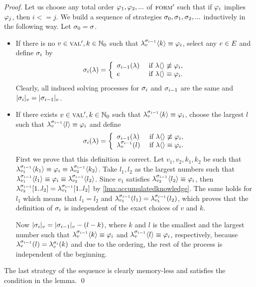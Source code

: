 \begin{proof}
Let us choose any total order $\varphi_1, \varphi_2, ...$ of ${\textsc{form}'}$ such that
  if $\varphi_i$ implies $\varphi_j$, then $i <= j$.
We build a sequence of strategies $\sigma_0, \sigma_1, \sigma_2, ...$ inductively in the following way.
Let $\sigma_0 = \sigma$.
\begin{itemize}
\item If there is no $v\in\textsc{val}', k\in\mathbb{N}_0$ such that
  $\lambda^{\sigma_{i-1}}_{v}\langle k\rangle \equiv \varphi_i$, select any $e\in E$ and
  define $\sigma_i$ by
\[
\sigma_i(\lambda) = \left\{
 \begin{array}{lll}
 \sigma_{i-1}(\lambda)  & \textrm{ if } \lambda\langle\rangle\not\equiv\varphi_i,\\
 e               & \textrm{ if } \lambda\langle\rangle\equiv\varphi_i.
 \end{array}
 \right.
\]
Clearly, all induced solving processes for $\sigma_i$ and $\sigma_{i-1}$ are the same
  and $|\sigma_i|_{v} = |\sigma_{i-1}|_{v}$.

\item If there exists $v\in\textsc{val}', k\in\mathbb{N}_0$ such that
  $\lambda^{\sigma_{i-1}}_{v}\langle k\rangle \equiv \varphi_i$, choose the largest $l$ such that
  $\lambda^{\sigma_{i-1}}_{v}\langle l\rangle \equiv \varphi_i$ and define
\[
\sigma_i(\lambda) = \left\{
 \begin{array}{lll}
 \sigma_{i-1}(\lambda)            & \textrm{ if } \lambda\langle\rangle\not\equiv\varphi_i,\\
 \lambda^{\sigma_{i-1}}_{v}(l)   & \textrm{ if } \lambda\langle\rangle\equiv\varphi_i.
 \end{array}
 \right.
\]
First we prove that this definition is correct.
Let $v_1, v_2, k_1, k_2$ be such that
  $\lambda^{\sigma_{i-1}}_{v_1}\langle k_1\rangle\equiv\varphi_i\equiv\lambda^{\sigma_{i-1}}_{v_2}\langle k_2\rangle$.
Take $l_1, l_2$ as the largest numbers such that
  $\lambda^{\sigma_{i-1}}_{v_1}\langle l_1\rangle\equiv\varphi_i\equiv\lambda^{\sigma_{i-1}}_{v_2}\langle l_2\rangle$.
Since $v_1$ satisfies $\lambda^{\sigma_{i-1}}_{v_2}\langle l_2\rangle\equiv\varphi_i$,
  then $\lambda^{\sigma_{i-1}}_{v_2}[1..l_2] = \lambda^{\sigma_{i-1}}_{v_1}[1..l_2]$
  by \autoref{lma:accumulatedknowledge}.
The same holds for $l_1$ which means that $l_1 = l_2$ and
  $\lambda^{\sigma_{i-1}}_{v_1}(l_1) = \lambda^{\sigma_{i-1}}_{v_1}(l_2)$, which
  proves that the definition of $\sigma_i$ is independent of the exact choices
  of $v$ and $k$.

Now $|\sigma_i|_{v} = |\sigma_{i-1}|_{v} - (l-k)$, where
  $k$ and $l$ is the smallest and the largest number such that
  $\lambda^{\sigma_{i-1}}_{v}\langle k\rangle\equiv\varphi_i $ and
  $\lambda^{\sigma_{i-1}}_{v}\langle l\rangle\equiv\varphi_i $, respectively,
  because
  $\lambda^{\sigma_{i-1}}_{v}(l) = \lambda^{\sigma_{i}}_{v}(k)$ and due to the ordering,
  the rest of the process is independent of the beginning.
\end{itemize}

The last strategy of the sequence is clearly memory-less and satisfies the
  condition in the lemma. \qed
\end{proof}

